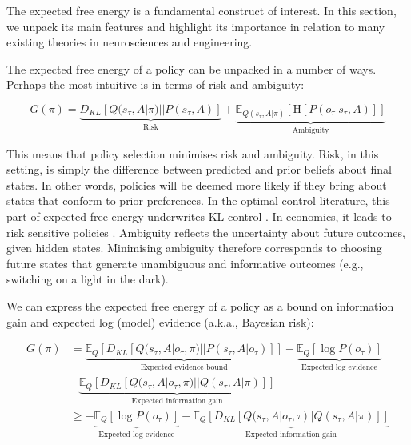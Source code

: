 \documentclass{article}
\begin{document}
The expected free energy is a fundamental construct of interest. In this section, we unpack its main features and highlight its importance in relation to many existing theories in neurosciences and engineering.

The expected free energy of a policy can be unpacked in a number of ways. Perhaps the most intuitive is in terms of risk and ambiguity:

\begin{equation}
    G(\pi) = \underbrace{D_{KL}[Q(s_\tau, A|\pi)||P(s_\tau, A)]}_{\text{Risk}}+ \underbrace{\mathbb E_{Q(s_\tau, A|\pi)}[\text{H} [ P(o_\tau |s_\tau, A)]]}_{\text{Ambiguity}}
\end{equation}

This means that policy selection minimises risk and ambiguity. Risk, in this setting, is simply the difference between predicted and prior beliefs about final states. In other words, policies will be deemed more likely if they bring about states that conform to prior preferences. In the optimal control literature, this part of expected free energy underwrites KL control \cite{todorovGeneralDualityOptimal2008,vandenbroekRiskSensitivePath2010}. In economics, it leads to risk sensitive policies \cite{flemingRisksensitiveControlOptimal2002}. Ambiguity reflects the uncertainty about future outcomes, given hidden states. Minimising ambiguity therefore corresponds to choosing future states that generate unambiguous and informative outcomes (e.g., switching on a light in the dark).

We can express the expected free energy of a policy as a bound on information gain and expected log (model) evidence (a.k.a., Bayesian risk): 

\begin{equation}
\label{eq: efe inf gain exp log evidence}
    \begin{split}
        G(\pi)
        &= \underbrace{\mathbb E_Q[D_{KL}[Q(s_\tau, A|o_\tau, \pi)||P(s_\tau, A|o_\tau)]]}_{\text{Expected evidence bound}}- \underbrace{\mathbb E_Q[\log P(o_\tau)]}_{\text{Expected log evidence}} \\
        &- \underbrace{\mathbb E_Q [D_{KL}[Q(s_\tau,A |o_\tau, \pi)||Q(s_\tau ,A|\pi)]]}_{\text{Expected information gain}} \\
        &\geq - \underbrace{\mathbb E_Q[\log P(o_\tau)]}_{\text{Expected log evidence}}- \underbrace{\mathbb E_Q [D_{KL}[Q(s_\tau,A |o_\tau, \pi)||Q(s_\tau,A |\pi)]]}_{\text{Expected information gain}} 
    \end{split}
\end{equation}
\end{document}
